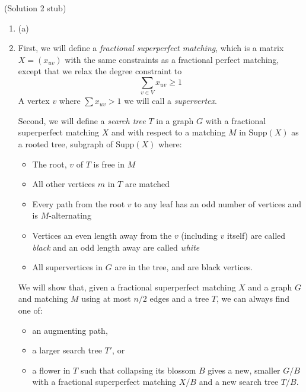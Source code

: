 \documentclass{hmcpset}
\begin{document}
\begin{solution}
(Solution 2 stub)
\begin{enumerate}
\item (a)
\item First, we will define a \emph{fractional superperfect matching}, which is a matrix $X=(x_{uv})$ with the same constraints as a fractional perfect matching, except that we relax the degree constraint to
\[\sum_{v\in V} x_{uv} \geq 1\]
A vertex $v$ where $\sum x_{uv} > 1$ we will call a \emph{supervertex}.

Second, we will define a \emph{search tree} $T$ in a graph $G$ with a fractional superperfect matching $X$ and with respect to a matching $M$ in $\text{Supp}(X)$ as a rooted tree, subgraph of $\text{Supp}(X)$ where:
\begin{itemize}
\item The root, $v$ of $T$ is free in $M$
\item All other vertices $m$ in $T$ are matched
\item Every path from the root $v$ to any leaf has an odd number of vertices and is $M$-alternating
\item Vertices an even length away from the $v$ (including $v$ itself) are called \emph{black} and an odd length away are called \emph{white}
\item All supervertices in $G$ are in the tree, and are black vertices.
\end{itemize}

We will show that, given a fractional superperfect matching $X$ and a graph $G$ and matching $M$ using at most $n/2$ edges and a tree $T$, we can always find one of:
\begin{itemize} 
\item an augmenting path,
\item a larger search tree $T'$, or
\item a flower in $T$ such that collapsing its blossom $B$ gives a new, smaller $G/B$ with a fractional superperfect matching $X/B$ and a new search tree $T/B$.
\end{itemize}


\end{enumerate}
\end{solution}
\end{document}
